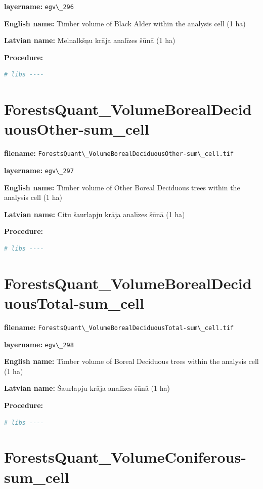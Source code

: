 \documentclass[
]{book}
\newcommand{\passthrough}[1]{#1}
\begin{document}
\textbf{layername:} \passthrough{\lstinline!egv\_296!}

\textbf{English name:} Timber volume of Black Alder within the analysis cell (1 ha)

\textbf{Latvian name:} Melnalkšņu krāja analīzes šūnā (1 ha)

\textbf{Procedure:}

\begin{lstlisting}[language=R]
# libs ----
\end{lstlisting}

\section{ForestsQuant\_VolumeBorealDeciduousOther-sum\_cell}\label{ch06.297}

\textbf{filename:} \passthrough{\lstinline!ForestsQuant\_VolumeBorealDeciduousOther-sum\_cell.tif!}

\textbf{layername:} \passthrough{\lstinline!egv\_297!}

\textbf{English name:} Timber volume of Other Boreal Deciduous trees within the analysis cell (1 ha)

\textbf{Latvian name:} Citu šaurlapju krāja analīzes šūnā (1 ha)

\textbf{Procedure:}

\begin{lstlisting}[language=R]
# libs ----
\end{lstlisting}

\section{ForestsQuant\_VolumeBorealDeciduousTotal-sum\_cell}\label{ch06.298}

\textbf{filename:} \passthrough{\lstinline!ForestsQuant\_VolumeBorealDeciduousTotal-sum\_cell.tif!}

\textbf{layername:} \passthrough{\lstinline!egv\_298!}

\textbf{English name:} Timber volume of Boreal Deciduous trees within the analysis cell (1 ha)

\textbf{Latvian name:} Šaurlapju krāja analīzes šūnā (1 ha)

\textbf{Procedure:}

\begin{lstlisting}[language=R]
# libs ----
\end{lstlisting}

\section{ForestsQuant\_VolumeConiferous-sum\_cell}\label{ch06.299}
\end{document}
